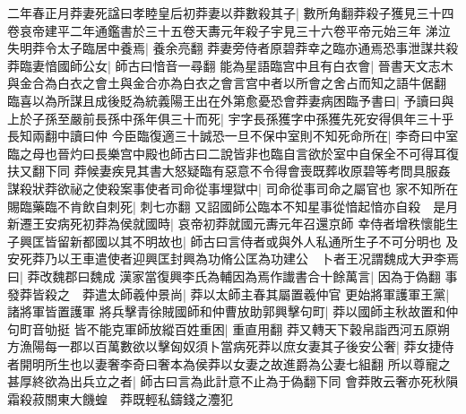 二年春正月莽妻死諡曰孝睦皇后初莽妻以莽數殺其子|{
	數所角翻莽殺子獲見三十四卷哀帝建平二年通鑑書於三十五卷天夀元年殺子宇見三十六卷平帝元始三年}
涕泣失明莽令太子臨居中養焉|{
	養余亮翻}
莽妻旁侍者原碧莽幸之臨亦通焉恐事泄謀共殺莽臨妻愔國師公女|{
	師古曰愔音一尋翻}
能為星語臨宫中且有白衣會|{
	晉書天文志木與金合為白衣之會土與金合亦為白衣之會言宫中者以所會之舍占而知之語牛倨翻}
臨喜以為所謀且成後貶為統義陽王出在外第愈憂恐會莽妻病困臨予書曰|{
	予讀曰與}
上於子孫至嚴前長孫中孫年俱三十而死|{
	宇字長孫獲字中孫獲先死安得俱年三十乎長知兩翻中讀曰仲}
今臣臨復適三十誠恐一旦不保中室則不知死命所在|{
	李奇曰中室臨之母也晉灼曰長樂宫中殿也師古曰二說皆非也臨自言欲於室中自保全不可得耳復扶又翻下同}
莽候妻疾見其書大怒疑臨有惡意不令得會喪既葬收原碧等考問具服姦謀殺狀莽欲祕之使殺案事使者司命從事埋獄中|{
	司命從事司命之屬官也}
家不知所在賜臨藥臨不肯飲自刺死|{
	刺七亦翻}
又詔國師公臨本不知星事從愔起愔亦自殺　是月新遷王安病死初莽為侯就國時|{
	哀帝初莽就國元夀元年召還京師}
幸侍者增秩懷能生子興匡皆留新都國以其不明故也|{
	師古曰言侍者或與外人私通所生子不可分明也}
及安死莽乃以王車遣使者迎興匡封興為功脩公匡為功建公　卜者王况謂魏成大尹李焉曰|{
	莽改魏郡曰魏成}
漢家當復興李氏為輔因為焉作䜟書合十餘萬言|{
	因為于偽翻}
事發莽皆殺之　莽遣太師羲仲景尚|{
	莽以太師主春其屬置羲仲官}
更始將軍護軍王黨|{
	諸將軍皆置護軍}
將兵擊青徐賊國師和仲曹放助郭興擊句町|{
	莽以國師主秋故置和仲句町音劬挺}
皆不能克軍師放縱百姓重困|{
	重直用翻}
莽又轉天下穀帛詣西河五原朔方漁陽每一郡以百萬數欲以擊匈奴須卜當病死莽以庶女妻其子後安公奢|{
	莽女捷侍者開明所生也以妻奢李奇曰奢本為侯莽以女妻之故進爵為公妻七組翻}
所以尊寵之甚厚終欲為出兵立之者|{
	師古曰言為此計意不止為于偽翻下同}
會莽敗云奢亦死秋隕霜殺菽關東大饑蝗　莽既輕私鑄錢之灋犯

